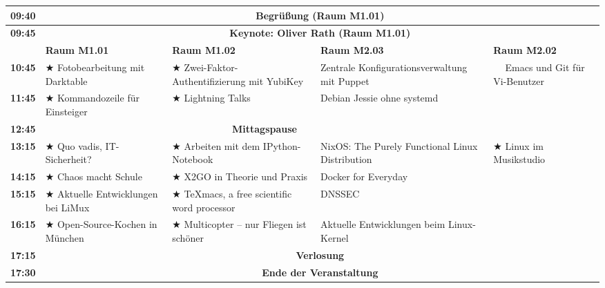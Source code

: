 \documentclass[10pt,a4paper,ngerman]{scrartcl}
\begin{document}
\begin{landscape}
\begin{center}\small\begin{tabular}{|c||l|l|l|l|}\hline
    \bfseries{09:40} & \multicolumn{4}{c|}{\rule[-3mm]{0mm}{8mm}{\bfseries{Begrüßung} (Raum M1.01)}}  \\ \hline
    \bfseries{09:45} &
    \multicolumn{4}{c|}{\rule[-3mm]{0mm}{8mm}{\bfseries Keynote: Oliver Rath (Raum M1.01)}}\\ \hline
      & \rule[-3mm]{0mm}{8mm}
        \bfseries{Raum M1.01} &
        \bfseries{Raum M1.02} &
        \bfseries{Raum M2.03} &
        \bfseries{Raum M2.02} \\ \hline \hline  
    \bfseries{10:45} & \rule[-3mm]{0mm}{8mm}
      $\bigstar$ Fotobearbeitung mit Darktable &
      $\bigstar$ Zwei-Faktor-Authentifizierung mit YubiKey &
      Zentrale Konfigurationsverwaltung mit Puppet &
      \multirow{3}{*}{$\phantom{\bigstar}$ Emacs und Git für Vi-Benutzer} \\
      \cline{1-4}
    \bfseries{11:45} & \rule[-3mm]{0mm}{8mm}
      $\bigstar$ Kommandozeile für Einsteiger &
      $\bigstar$ Lightning Talks &
      Debian Jessie ohne systemd &
      \\ \hline
    \bfseries{12:45} & \multicolumn{4}{c|}{\rule[-3mm]{0mm}{8mm}{\bfseries{Mittagspause}} }\\ \hline
    \bfseries{13:15} & \rule[-3mm]{0mm}{8mm}
      $\bigstar$ Quo vadis, IT-Sicherheit? &
      $\bigstar$ Arbeiten mit dem IPython-Notebook &
      NixOS: The Purely Functional Linux Distribution &
      \multirow{3}{*}{$\bigstar$ Linux im Musikstudio}
      \\ \cline{1-4}
    \bfseries{14:15} & \rule[-3mm]{0mm}{8mm}
      $\bigstar$ Chaos macht Schule &
      $\bigstar$ X2GO in Theorie und Praxis &
      Docker for Everyday & \\ \hline
    \bfseries{15:15} & \rule[-3mm]{0mm}{8mm}
      $\bigstar$ Aktuelle Entwicklungen bei LiMux &
      $\bigstar$ TeXmacs, a free scientific word processor &
      DNSSEC &
      $\bigstar$ Schicke Briefe mit LibreOffice
      \\ \hline 
    \bfseries{16:15} & \rule[-3mm]{0mm}{8mm}
      $\bigstar$ Open-Source-Kochen in München &
      $\bigstar$ Multicopter -- nur Fliegen ist schöner &
      Aktuelle Entwicklungen beim Linux-Kernel & \\ \hline
    \bfseries{17:15} & \multicolumn{4}{c|}{\rule[-3mm]{0mm}{8mm}{\bfseries{Verlosung}}} \\ \hline
    \bfseries{17:30} & \multicolumn{4}{c|}{\rule[-3mm]{0mm}{8mm}{\bfseries{Ende der Veranstaltung}}} \\ \hline
\end{tabular}\end{center}


\end{landscape}
\end{document}
